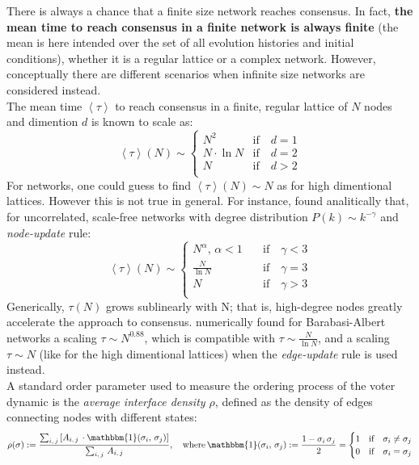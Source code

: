 There is always a chance that a finite size network reaches consensus. In fact, \textbf{the mean time to reach consensus in a finite network is always finite} (the mean is here intended over the set of all evolution histories and initial conditions), whether it is a regular lattice or a complex network. However, conceptually there are different scenarios when infinite size networks are considered instead.\\
The mean time $\left \langle \tau \right \rangle$ to reach consensus in a finite, regular lattice of $N$ nodes and dimention $d$ is known to scale as:
\begin{equation*}
    \left \langle \tau \right \rangle(N) \sim
    \begin{cases}
        N^2 \quad &\text{if}\quad d=1 \\
        N\cdot \ln{N} &\text{if}\quad d=2 \\
        N &\text{if}\quad d>2 \\
    \end{cases}
\end{equation*}
For networks, one could guess to find $\left \langle \tau \right \rangle(N) \sim N$ as for high dimentional lattices. However this is not true in general. For instance, \cite{sood} found analitically that, for uncorrelated, scale-free networks with degree distribution $P(k)\sim k^{-\gamma}$ and \textit{node-update} rule:
\begin{equation*}
    \left \langle \tau \right \rangle(N) \sim
        \begin{cases}
         N^{\alpha}, \, \alpha<1 \quad &\text{if}\quad \gamma < 3 \\
        \frac{N}{\ln{N}} &\text{if}\quad \gamma = 3 \\
         N &\text{if}\quad \gamma > 3 \\
    \end{cases}
\end{equation*}
Generically, $\tau(N)$ grows sublinearly with N; that is, high-degree nodes greatly accelerate the approach to consensus. \cite{suchecki_numerical} numerically found for Barabasi-Albert networks a scaling $\tau \sim N^{0.88}$, which is compatible with $\tau \sim \frac{N}{\ln{N}}$, and a scaling $\tau \sim N$ (like for the high dimentional lattices) when the \textit{edge-update} rule is used instead. \\
A standard order parameter used to measure the ordering process of the voter dynamic is the \textit{average interface density $\rho$}, defined as the density of edges connecting nodes with different states:
\begin{equation}
    \rho(\mathbf{\sigma}) := \frac{\sum_{i,\,j}\left[A_{i,\,j}\,\cdot \mathbbm{1}(\sigma_i,\,\sigma_j)\right]}{\sum_{i,\,j}\, A_{i,\,j}}, \quad \text{where} \, \mathbbm{1}(\sigma_i,\,\sigma_j):= \frac{1 - \sigma_i\,\sigma_j}{2} = 
    \begin{cases}
        1 & \text{if}\quad \sigma_i\neq \sigma_j \\
        0 & \text{if}\quad \sigma_i= \sigma_j \\
    \end{cases}
\label{eq:rho}
\end{equation}
